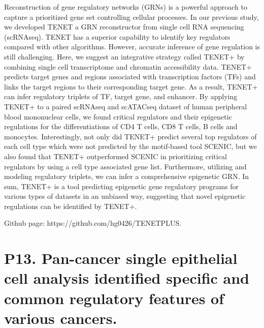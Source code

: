 \noindent
Reconstruction of gene regulatory networks (GRNs) is a powerful approach to capture a prioritized gene set controlling cellular processes. In our previous study, we developed TENET a GRN reconstructor from single cell RNA sequencing (scRNAseq). TENET has a superior capability to identify key regulators compared with other algorithms. However, accurate inference of gene regulation is still challenging. Here, we suggest an integrative strategy called TENET+ by combining single cell transcriptome and chromatin accessibility data. TENET+ predicts target genes and regions associated with transcription factors (TFs) and links the target regions to their corresponding target gene. As a result, TENET+ can infer regulatory triplets of TF, target gene, and enhancer. By applying TENET+ to a paired scRNAseq and scATACseq dataset of human peripheral blood mononuclear cells, we found critical regulators and their epigenetic regulations for the differentiations of CD4 T cells, CD8 T cells, B cells and monocytes. Interestingly, not only did TENET+ predict several top regulators of each cell type which were not predicted by the motif-based tool SCENIC, but we also found that TENET+ outperformed SCENIC in prioritizing critical regulators by using a cell type associated gene list. Furthermore, utilizing and modeling regulatory triplets, we can infer a comprehensive epigenetic GRN. In sum, TENET+ is a tool predicting epigenetic gene regulatory programs for various types of datasets in an unbiased way, suggesting that novel epigenetic regulations can be identified by TENET+. 

Github page: https://github.com/hg0426/TENETPLUS.
\newpage


\section*{P13. Pan-cancer single epithelial cell analysis identified specific and common regulatory features of various cancers.}

